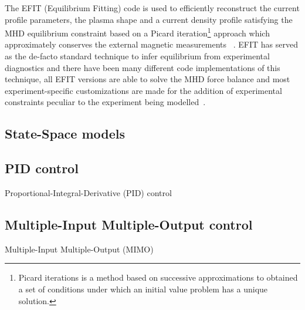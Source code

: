 The EFIT (Equilibrium Fitting) code is used to efficiently reconstruct the current profile parameters, the plasma shape  and a current density profile satisfying the MHD equilibrium constraint  based on a Picard iteration\footnote{Picard iterations is a method based on  successive approximations to obtained a set of conditions under which an initial value problem has a unique solution.} approach which approximately conserves the external magnetic measurements ~\cite{EFIT1985}. EFIT has served as the de-facto standard technique to infer equilibrium from experimental diagnostics and there have been many different code implementations of this technique, all EFIT versions  are able to solve the MHD force balance and most experiment-specific customizations are made for the addition of experimental constraints peculiar to the experiment being modelled~\cite{EFIT2013}.

\subsection{State-Space models}



\subsection{PID control}

Proportional-Integral-Derivative (PID) control 

\subsection{Multiple-Input Multiple-Output control}

Multiple-Input Multiple-Output (MIMO)